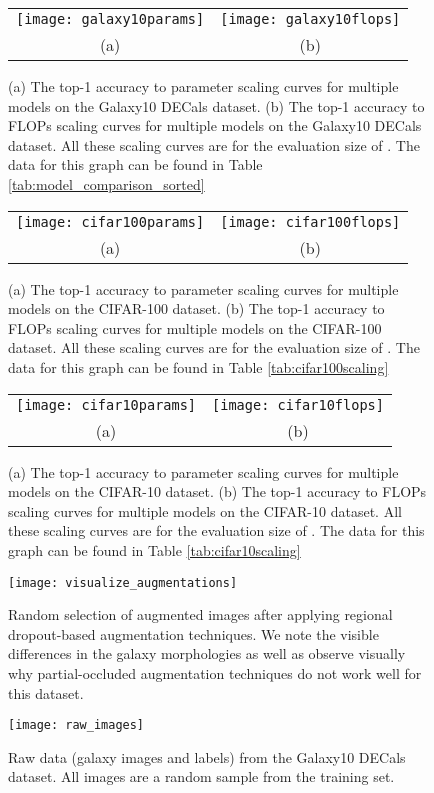 \documentclass{article} \usepackage{iclr2023_conference,times}
\begin{document}
\begin{figure}[ht]
    \centering
    \begin{tabular}{cc}
        \texttt{[image: galaxy10params]} & 
        \texttt{[image: galaxy10flops]} \\
        (a) & (b)
    \end{tabular}
    \caption{(a) The top-1 accuracy to parameter scaling curves for multiple models on the Galaxy10 DECals dataset. (b) The top-1 accuracy to FLOPs scaling curves for multiple models on the Galaxy10 DECals dataset. All these scaling curves are for the evaluation size of . The data for this graph can be found in Table \ref{tab:model_comparison_sorted}}
    \label{fig:image_ab}
\end{figure}

\begin{figure}[ht]
    \centering
    \begin{tabular}{cc}
        \texttt{[image: cifar100params]} & 
        \texttt{[image: cifar100flops]} \\
        (a) & (b)
    \end{tabular}
    \caption{(a) The top-1 accuracy to parameter scaling curves for multiple models on the CIFAR-100 dataset. (b) The top-1 accuracy to FLOPs scaling curves for multiple models on the CIFAR-100 dataset. All these scaling curves are for the evaluation size of . The data for this graph can be found in Table \ref{tab:cifar100scaling}}
    \label{fig:cifar100scalingfig}
\end{figure}

\begin{figure}[ht]
    \centering
    \begin{tabular}{cc}
        \texttt{[image: cifar10params]} & 
        \texttt{[image: cifar10flops]} \\
        (a) & (b)
    \end{tabular}
    \caption{(a) The top-1 accuracy to parameter scaling curves for multiple models on the CIFAR-10 dataset. (b) The top-1 accuracy to FLOPs scaling curves for multiple models on the CIFAR-10 dataset. All these scaling curves are for the evaluation size of . The data for this graph can be found in Table \ref{tab:cifar10scaling}}
    \label{fig:cifarscaling}
\end{figure}

\begin{figure}[ht]
    \centering
    \texttt{[image: visualize\_augmentations]}
    \caption{Random selection of augmented images after applying regional dropout-based augmentation techniques. We note the visible differences in the galaxy morphologies as well as observe visually why partial-occluded augmentation techniques do not work well for this dataset.}
    \label{fig:visualizeaugmentations}
\end{figure}

\newpage
\begin{figure}[ht]
    \centering
    \texttt{[image: raw\_images]}
    \caption{Raw data (galaxy images and labels) from the Galaxy10 DECals dataset. All images are a random sample from the training set.}
    \label{fig:rawimages}
\end{figure}
\end{document}
